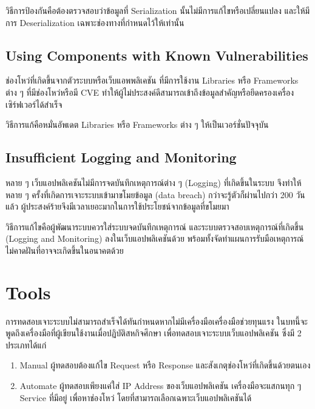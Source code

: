 วิธีการป้องกันคือต้องตรวจสอบว่าข้อมูลที่ Serialization นั้นไม่มีการแก้ไขหรือเปลี่ยนแปลง และให้มีการ Deserialization เฉพาะช่องทางที่กำหนดไว้ให้เท่านั้น

\subsection{Using Components with Known Vulnerabilities}

ช่องโหว่ที่เกิดขึ้นจากตัวระบบหรือเว็บแอพพลิเคชัน ที่มีการใช้งาน Libraries หรือ Frameworks ต่าง ๆ ที่มีช่องโหว่หรือมี CVE ทำให้ผู้ไม่ประสงค์ดีสามารถเข้าถึงข้อมูลสำคัญหรือยึดครองเครื่องเซิร์ฟเวอร์ได้สำเร็จ

วิธีการแก้คือหมั่นอัพเดต Libraries หรือ Frameworks ต่าง ๆ ให้เป็นเวอร์ชั่นปัจจุบัน

\subsection{Insufficient Logging and Monitoring}
หลาย ๆ เว็บแอปพลิเคชันไม่มีการจดบันทึกเหตุการณ์ต่าง ๆ (Logging) ที่เกิดขึ้นในระบบ จึงทำให้หลาย ๆ ครั้งที่เกิดการเจาะระบบเข้ามาขโมยข้อมูล (data breach) กว่าจะรู้ตัวก็ผ่านไปกว่า 200 วันแล้ว \cite{breachdiscovery} ผู้ประสงค์ร้ายจึงมีเวลาเยอะมากในการใช้ประโยชน์จากข้อมูลที่ขโมยมา

วิธีการแก้ไขคือผู้พัฒนาระบบควรใส่ระบบจดบันทึกเหตุการณ์ และระบบตรวจสอบเหตุการณ์ที่เกิดขึ้น (Logging and Monitoring) ลงในเว็บแอปพลิเคชันด้วย พร้อมทั้งจัดทำแผนการรับมือเหตุการณ์ไม่คาดฝันที่อาจจะเกิดขึ้นในอนาคตด้วย

\section{Tools}

การทดสอบเจาะระบบไม่สามารถสำเร็จได้ทันกำหนดหากไม่มีเครื่องมือเครื่องมือช่วยทุนแรง ในบทนี้จะพูดถึงเครื่องมือที่ผู้เขียนใช้งานเมื่อปฏิบัติสหกิจศึกษา เพื่อทดสอบเจาะระบบเว็บแอปพลิเคชัน ซึ่งมี 2 ประเภทได้แก่

\begin{enumerate}
	\itemsep0em 
	\item Manual ผู้ทดสอบต้องแก้ไข Request หรือ Response และสังเกตุช่องโหว่ที่เกิดขึ้นด้วยตนเอง 
	\item Automate ผู้ทดสอบเพียงแค่ใส่ IP Address ของเว็บแอปพลิเคชัน เครื่องมือจะแสกนทุก ๆ Service ที่มีอยู่ เพื่อหาช่องโหว่ โดยที่สามารถเลือกเฉพาะเว็บแอปพลิเคชันได้
\end{enumerate}

